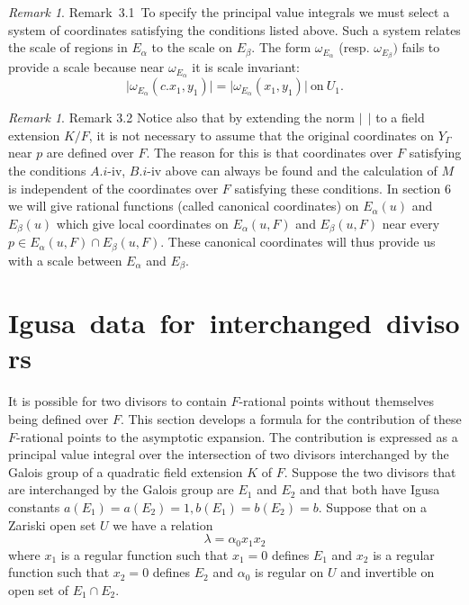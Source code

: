 \documentclass{memo-l}
\theoremstyle{definition}
\theoremstyle{remark}
\newtheorem{remark}[theorem]{Remark}
\numberwithin{section}{chapter}
\numberwithin{equation}{chapter}
\begin{document}
\begin{remark}{Remark\  3.1}\ To specify the principal value integrals we must
select a system of coordinates satisfying the conditions listed above.
Such a system relates the scale of regions in $E_{{\alpha}}$ to the scale
on $E_{{\beta}}$.  The form ${\omega}_{E_\alpha}$ (resp. ${\omega}_{E_\beta} )$ fails to provide a scale because near
${\omega}_{E_\alpha}$ it is scale invariant:
$$
\vert {\omega}_{E_\alpha} (c.x_{1},y_{1})\vert  =  \vert {\omega}_{E_\alpha}
(x_{1},y_{1})\vert\ {\text{on}}\ U_{1}.
$$
\end{remark}

\begin{remark}{Remark 3.2} Notice also that by extending the norm $\vert\
\
\vert$ to a field extension $K/F$, it is not necessary to assume that the
original coordinates on $Y_{{\Gamma}}$ near $p$ are defined over $F$.  The
reason for this is that coordinates over $F$ satisfying the conditions
$A.i$-iv, $B.i$-iv above can always be found and the calculation of $M$ is
independent of the coordinates over $F$ satisfying these conditions.  In
section $6$ we will give rational functions (called canonical coordinates)
on $E_{{\alpha}}(u)$ and $E_{{\beta}}(u)$ which give local coordinates on
$E_{{\alpha}}(u,F)$ and $E_{\beta}(u,F)$ near every $p \in
E_{{\alpha}}(u,F) \cap E_{{\beta}}(u,F)$.  These canonical coordinates
will thus provide us with a scale between $E_{{\alpha}}$ and $E_{{\beta}}$.
\end{remark}

\section{Igusa\ data\ for\ interchanged\ divisors}

   It is possible for two divisors to contain $F$-rational points without
themselves being defined over $F$.  This section develops a formula for the
contribution of these $F$-rational points to the asymptotic expansion.  The
contribution is expressed as a principal value integral over the
intersection of two divisors interchanged by the Galois group of a
quadratic field extension $K$ of $F$.  Suppose the two divisors that are
interchanged by the Galois group are $E_{1}$ and $E_{2}$ and that both have
Igusa constants $a(E_{1}) = a(E_{2}) = 1, b(E_{1}) = b(E_{2}) = b$.
Suppose that on a Zariski open set $U$ we have a relation
$$
{\lambda} = {\alpha}_{0}x_{1}x_{2}
$$
where $x_{1}$ is a regular function such that $x_{1} = 0$ defines $E_{1}$
and $x_{2}$ is a regular function such that $x_{2} = 0$ defines $E_{2}$ and
${\alpha}_{0}$ is regular on $U$ and invertible on open set of $E_{1}
\cap E_{2}$.
\end{document}
